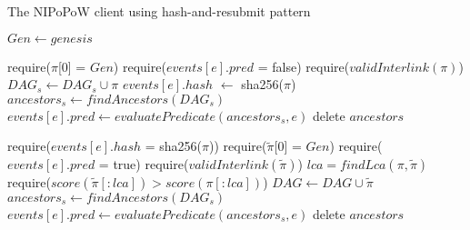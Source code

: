 \begin{algorithm}
    \label{alg:har-nipopow}
    \caption{The \textsf{NIPoPoW} client using hash-and-resubmit pattern}
    \begin{algorithmic}[1]
            \State $Gen \gets genesis$
        \EndFunction
    \vskip8pt
    \end{algorithmic}

    \begin{algorithmic}[1]
        \State require($\pi$[0] = $Gen$)
        \State require($events[e].pred$ = false)
        \State require($validInterlink(\pi)$)
        \State $DAG_s \gets DAG_s \cup \pi$
        \State $events[e].hash$ $\gets$ sha256($\pi$)
        \State $ancestors_s \gets findAncestors(DAG_s)$
        \State $events[e].pred \gets evaluatePredicate(ancestors_s, e)$
        \State delete $ancestors$
    \EndFunction
    \vskip8pt
    \end{algorithmic}

    \begin{algorithmic}[1]
        \State require($events[e].hash$ = sha256($\pi$))
        \State require($\tilde\pi$[0] = $Gen$)
        \State require($events[e].pred$ = true)
        \State require($validInterlink(\tilde\pi)$)
        \State $lca = findLca(\pi, \tilde\pi)$
        \State require($score(\tilde\pi[:lca]) > score(\pi[:lca])$)
        \State $DAG \gets DAG \cup \tilde\pi$
        \State $ancestors_s \gets findAncestors(DAG_s)$
        \State $events[e].pred \gets evaluatePredicate(ancestors_s, e)$
        \State delete $ancestors$
    \EndFunction
    \vskip8pt
    \end{algorithmic}
\end{algorithm}

